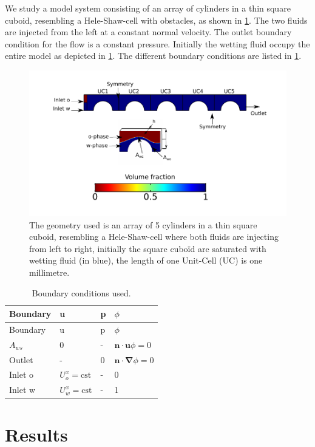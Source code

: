 \documentclass[]{article}
\begin{document}
We study a model system consisting of an array of cylinders in a thin
square cuboid, resembling a Hele-Shaw-cell with obstacles, as shown in
\cref{fig:model}. The two fluids are injected from the left at a
constant normal velocity. The outlet boundary condition for the flow is
a constant pressure. Initially the wetting fluid occupy the entire model
as depicted in \cref{fig:model}. The different boundary conditions are
listed in \cref{tbl:BC}.

\begin{figure}
\hypertarget{fig:model}{%
\centering
\includegraphics{figures/pdf/model.pdf}
\caption{The geometry used is an array of 5 cylinders in a thin square
cuboid, resembling a Hele-Shaw-cell where both fluids are injecting from
left to right, initially the square cuboïd are saturated with wetting
fluid (in blue), the length of one Unit-Cell (UC) is one
millimetre.}\label{fig:model}
}
\end{figure}

\begin{longtable}[]{@{}llll@{}}
\caption{Boundary conditions used. \label{tbl:BC}}\tabularnewline
\toprule
Boundary & u & p & \(\phi\)\tabularnewline
\midrule
\endfirsthead
\toprule
Boundary & u & p & \(\phi\)\tabularnewline
\midrule
\endhead
\(A_{ws}\) & 0 & - & \(\mathbf{n}\cdot\mathbf{u}\phi=0\)\tabularnewline
Outlet & - & 0 &
\(\mathbf{n}\cdot\boldsymbol{\nabla}\phi=0\)\tabularnewline
Inlet o & \(U_{o}^{x}=\mathrm{cst}\) & - & 0\tabularnewline
Inlet w & \(U_{w}^{x}=\mathrm{cst}\) & - & 1\tabularnewline
\bottomrule
\end{longtable}

\hypertarget{results}{%
\section{Results}\label{results}}
\end{document}
